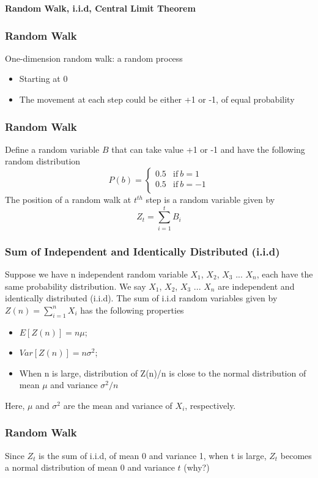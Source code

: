 \documentclass[notheorems, aspectratio=54]{beamer}
\begin{document}
\begin{frame}
\begin{center}
\bf{Random Walk, i.i.d, Central Limit Theorem}
\end{center}
\end{frame}



\begin{frame}
\frametitle{Random Walk}
One-dimension random walk: a random process
\begin{itemize}
\item Starting at 0
\item The movement at each step could be either +1 or -1, of equal probability
\end{itemize}
\end{frame}


\begin{frame}
\frametitle{Random Walk}

Define a random variable $B$ that can take value +1 or -1 and have the following random distribution
$$    
P(b) =
    \left\{
        \begin{array}{cc}
                0.5 & \mathrm{if\ } b=1 \\
                0.5 & \mathrm{if\ } b=-1 \\
        \end{array} 
    \right.
$$
The position of a random walk at $t^{th}$ step is a random variable given by 
$$
Z_t=\sum_{i=1}^{t} B_i
$$
\end{frame}

\begin{frame}

\frametitle{Sum of Independent  and  Identically  Distributed (i.i.d)}
Suppose we have n independent random variable $X_1$, $X_2$, $X_3$ ... $X_n$, each have the same probability distribution. We say  $X_1$, $X_2$, $X_3$ ... $X_n$ are
independent  and  identically  distributed (i.i.d). 
The sum of i.i.d random variables given by $Z(n)=\sum_{i=1}^{n} X_i$ has the following properties

\vspace{2mm}

\begin{itemize}
\item $E[Z(n)]=n\mu$;
\item $Var[Z(n)]=n\sigma^2$;
\item When n is large, distribution of Z(n)/n is close to the normal distribution of mean $\mu$ and variance $\sigma^2/n$
\end{itemize}

Here, $\mu$ and $\sigma^2$ are the mean and variance of $X_i$, respectively.


\end{frame}

\begin{frame}
\frametitle{Random Walk}
Since $Z_t$ is the sum of i.i.d, of mean 0 and variance 1, when t is large, $Z_t$ becomes a normal distribution of mean 0 and variance $t$ (why?)

\end{frame}
\end{document}
